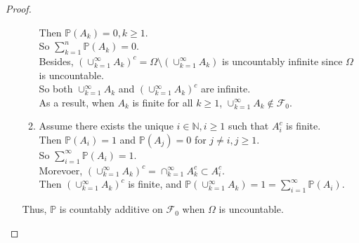 \documentclass{article}
\newcommand{\bbp}{\mathbb{P}}
\newcommand{\bbn}{\mathbb{N}}
\newcommand{\llf}{\mathcal{F}}
\begin{document}
\begin{proof}
\begin{enumerate}[(a)]
\begin{enumerate}[(1)]
				Then $\bbp(A_k) = 0, k \geq 1$.\\
				So $\sum_{k=1}^n \bbp (A_k) = 0$.\\
				Besides, $(\cup_{k=1}^{\infty} A_k)^c = \Omega\setminus(\cup_{k=1}^{\infty} A_k)$ is uncountably infinite since $\Omega$ is uncountable.\\
				So both $\cup_{k=1}^{\infty} A_k$ and $(\cup_{k=1}^{\infty} A_k)^c$ are infinite.\\
				As a result, when $A_k$ is finite for all $k \geq 1$, $\cup_{k=1}^{\infty} A_k \not\in \llf_0$. 
			\item 
			Assume there exists the unique $i \in \bbn, i \geq 1$ such that $A_i^c$ is finite.\\
            Then $\bbp(A_i) = 1$ and $\bbp(A_j) = 0$ for $j \neq i, j \geq 1$.\\
            So $\sum_{i=1}^{\infty}\bbp(A_i) = 1.$ \\
			Morevoer, $(\cup_{k=1}^{\infty} A_k)^c  = \cap_{k=1}^{\infty} A_k^c \subset A_i^c $.\\
            Then $(\cup_{k=1}^{\infty} A_k)^c$ is finite, and $\bbp(\cup_{k=1}^{\infty} A_k) = 1 = \sum_{i=1}^{\infty}\bbp(A_i).$ 
		\end{enumerate}
        Thus, $\bbp$ is countably additive on $\llf_0$ when $\Omega$ is uncountable.
	\end{enumerate}
	\end{proof}
\end{document}
